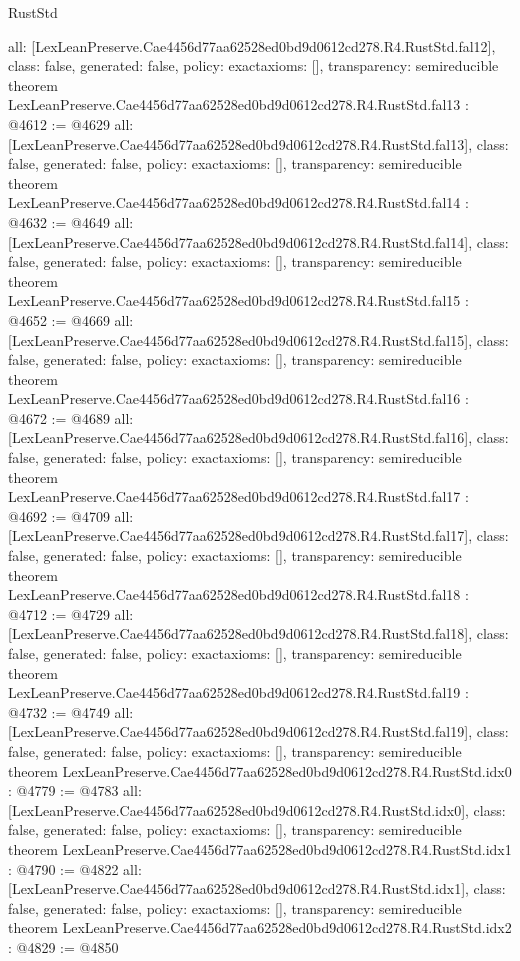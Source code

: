 \begin{lexlean}{RustStd}
\begin{coremodule}
{  all: [LexLeanPreserve.Cae4456d77aa62528ed0bd9d0612cd278.R4.RustStd.fal12],
  class: false,
  generated: false,
  policy: exact{axioms: []},
  transparency: semireducible
}
theorem LexLeanPreserve.Cae4456d77aa62528ed0bd9d0612cd278.R4.RustStd.fal13 : @4612 := @4629 {
  all: [LexLeanPreserve.Cae4456d77aa62528ed0bd9d0612cd278.R4.RustStd.fal13],
  class: false,
  generated: false,
  policy: exact{axioms: []},
  transparency: semireducible
}
theorem LexLeanPreserve.Cae4456d77aa62528ed0bd9d0612cd278.R4.RustStd.fal14 : @4632 := @4649 {
  all: [LexLeanPreserve.Cae4456d77aa62528ed0bd9d0612cd278.R4.RustStd.fal14],
  class: false,
  generated: false,
  policy: exact{axioms: []},
  transparency: semireducible
}
theorem LexLeanPreserve.Cae4456d77aa62528ed0bd9d0612cd278.R4.RustStd.fal15 : @4652 := @4669 {
  all: [LexLeanPreserve.Cae4456d77aa62528ed0bd9d0612cd278.R4.RustStd.fal15],
  class: false,
  generated: false,
  policy: exact{axioms: []},
  transparency: semireducible
}
theorem LexLeanPreserve.Cae4456d77aa62528ed0bd9d0612cd278.R4.RustStd.fal16 : @4672 := @4689 {
  all: [LexLeanPreserve.Cae4456d77aa62528ed0bd9d0612cd278.R4.RustStd.fal16],
  class: false,
  generated: false,
  policy: exact{axioms: []},
  transparency: semireducible
}
theorem LexLeanPreserve.Cae4456d77aa62528ed0bd9d0612cd278.R4.RustStd.fal17 : @4692 := @4709 {
  all: [LexLeanPreserve.Cae4456d77aa62528ed0bd9d0612cd278.R4.RustStd.fal17],
  class: false,
  generated: false,
  policy: exact{axioms: []},
  transparency: semireducible
}
theorem LexLeanPreserve.Cae4456d77aa62528ed0bd9d0612cd278.R4.RustStd.fal18 : @4712 := @4729 {
  all: [LexLeanPreserve.Cae4456d77aa62528ed0bd9d0612cd278.R4.RustStd.fal18],
  class: false,
  generated: false,
  policy: exact{axioms: []},
  transparency: semireducible
}
theorem LexLeanPreserve.Cae4456d77aa62528ed0bd9d0612cd278.R4.RustStd.fal19 : @4732 := @4749 {
  all: [LexLeanPreserve.Cae4456d77aa62528ed0bd9d0612cd278.R4.RustStd.fal19],
  class: false,
  generated: false,
  policy: exact{axioms: []},
  transparency: semireducible
}
theorem LexLeanPreserve.Cae4456d77aa62528ed0bd9d0612cd278.R4.RustStd.idx0 : @4779 := @4783 {
  all: [LexLeanPreserve.Cae4456d77aa62528ed0bd9d0612cd278.R4.RustStd.idx0],
  class: false,
  generated: false,
  policy: exact{axioms: []},
  transparency: semireducible
}
theorem LexLeanPreserve.Cae4456d77aa62528ed0bd9d0612cd278.R4.RustStd.idx1 : @4790 := @4822 {
  all: [LexLeanPreserve.Cae4456d77aa62528ed0bd9d0612cd278.R4.RustStd.idx1],
  class: false,
  generated: false,
  policy: exact{axioms: []},
  transparency: semireducible
}
theorem LexLeanPreserve.Cae4456d77aa62528ed0bd9d0612cd278.R4.RustStd.idx2 : @4829 := @4850 {
}
\end{coremodule}
\end{lexlean}
